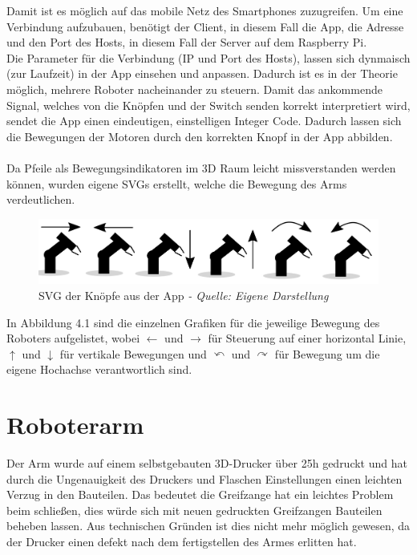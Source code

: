 \documentclass[12pt,					%
							 oneside,			%
							 a4paper,			%
							 halfparskip,		%
							 liststotoc,			%
							 bibtotoc,			%
							 fleqn,				%
							 pointlessnumbers]	%
							 {scrreprt}
\begin{document}
Damit ist es möglich auf das mobile Netz des Smartphones zuzugreifen. Um eine Verbindung aufzubauen, benötigt der Client, in diesem Fall die App, die Adresse und den Port des Hosts, in diesem Fall der Server auf dem Raspberry Pi. \\
Die Parameter für die Verbindung (IP und Port des Hosts), lassen sich dynmaisch (zur Laufzeit) in der App einsehen und anpassen. Dadurch ist es in der Theorie möglich, mehrere Roboter nacheinander zu steuern. 
Damit das ankommende Signal, welches von die Knöpfen und der Switch senden korrekt interpretiert wird, sendet die App einen eindeutigen, einstelligen Integer Code. Dadurch lassen sich die Bewegungen der Motoren durch den korrekten Knopf in der App abbilden. \\ \\
Da Pfeile als Bewegungsindikatoren im 3D Raum leicht missverstanden werden können, wurden eigene SVGs erstellt, welche die Bewegung des Arms verdeutlichen. \\
\begin{figure}[h]
	\centering
	\includegraphics[scale=0.3]{pictures/robissvg.jpg}
	\caption{SVG der Knöpfe aus der App \textit{- Quelle: Eigene Darstellung}}
\end{figure}
\newpage
In Abbildung 4.1 sind die einzelnen Grafiken für die jeweilige Bewegung des Roboters aufgelistet, wobei $\leftarrow$ und $\rightarrow$ für Steuerung auf einer horizontal Linie, $\uparrow$ und $\downarrow$ für vertikale Bewegungen und $\curvearrowleft$ und $\curvearrowright$ für Bewegung um die eigene Hochachse verantwortlich sind.

\section{Roboterarm}
Der Arm wurde auf einem selbstgebauten 3D-Drucker über 25h gedruckt und hat durch die Ungenauigkeit des Druckers und Flaschen Einstellungen einen leichten Verzug in den Bauteilen. Das bedeutet die Greifzange hat ein leichtes Problem beim schließen, dies würde sich mit neuen gedruckten Greifzangen Bauteilen beheben lassen. Aus technischen Gründen ist dies nicht mehr möglich gewesen, da der Drucker einen defekt nach dem fertigstellen des Armes erlitten hat.
\end{document}

